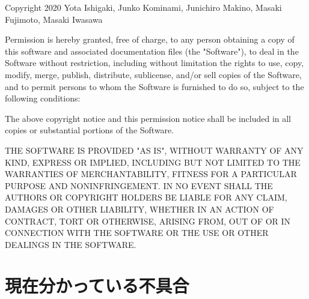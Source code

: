 \documentclass[12pt,a4paper,dvipdfmx]{jsarticle}
\begin{document}
Copyright 2020 Yota Ishigaki, Junko Kominami, Junichiro Makino, Masaki Fujimoto, Masaki Iwasawa

Permission is hereby granted, free of charge, to any person obtaining a copy of this software and associated documentation files (the "Software"), to deal in the Software without restriction, including without limitation the rights to use, copy, modify, merge, publish, distribute, sublicense, and/or sell copies of the Software, and to permit persons to whom the Software is furnished to do so, subject to the following conditions:

The above copyright notice and this permission notice shall be included in all copies or substantial portions of the Software.

THE SOFTWARE IS PROVIDED "AS IS", WITHOUT WARRANTY OF ANY KIND, EXPRESS OR IMPLIED, INCLUDING BUT NOT LIMITED TO THE WARRANTIES OF MERCHANTABILITY, FITNESS FOR A PARTICULAR PURPOSE AND NONINFRINGEMENT. IN NO EVENT SHALL THE AUTHORS OR COPYRIGHT HOLDERS BE LIABLE FOR ANY CLAIM, DAMAGES OR OTHER LIABILITY, WHETHER IN AN ACTION OF CONTRACT, TORT OR OTHERWISE, ARISING FROM, OUT OF OR IN CONNECTION WITH THE SOFTWARE OR THE USE OR OTHER DEALINGS IN THE SOFTWARE.


\section{現在分かっている不具合\label{s:error}}
\end{document}
